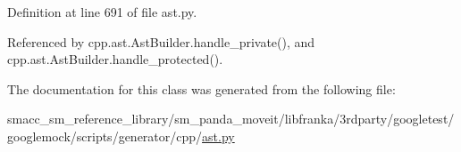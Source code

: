 Definition at line 691 of file ast.\+py.



Referenced by cpp.\+ast.\+Ast\+Builder.\+handle\+\_\+private(), and cpp.\+ast.\+Ast\+Builder.\+handle\+\_\+protected().



The documentation for this class was generated from the following file\+:\begin{DoxyCompactItemize}
\item 
smacc\+\_\+sm\+\_\+reference\+\_\+library/sm\+\_\+panda\+\_\+moveit/libfranka/3rdparty/googletest/googlemock/scripts/generator/cpp/\hyperlink{ast_8py}{ast.\+py}\end{DoxyCompactItemize}
